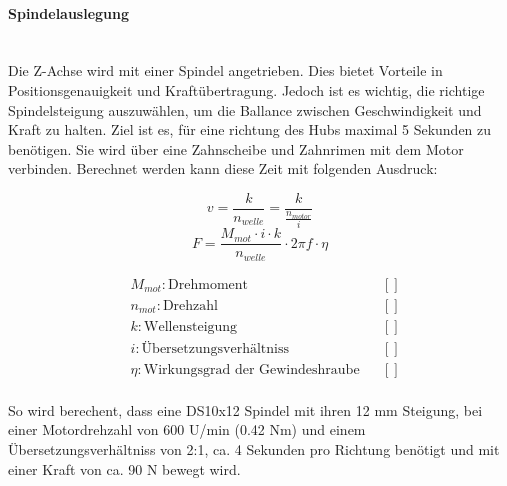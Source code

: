 \paragraph{Spindelauslegung}\mbox{}\\
Die Z-Achse wird mit einer Spindel angetrieben. Dies bietet Vorteile in Positionsgenauigkeit und Kraftübertragung. Jedoch ist es wichtig, die richtige Spindelsteigung auszuwählen, um die Ballance zwischen Geschwindigkeit und Kraft zu halten. Ziel ist es, für eine richtung des Hubs maximal 5 Sekunden zu benötigen. Sie wird über eine Zahnscheibe und Zahnrimen mit dem Motor verbinden.
Berechnet werden kann diese Zeit mit folgenden Ausdruck:

\vspace{5mm}
\noindent\begin{minipage}{\textwidth}
\begin{minipage}[t]{0.5\textwidth}
    \begin{equation*}
        v = \frac{k}{n_{welle}} = \frac{k}{\frac{n_{motor}}{i}}
    \end{equation*}
    \begin{equation*}
        F = \frac{M_{mot} \cdot i \cdot k}{n_{welle}} \cdot 2 \pi f \cdot \eta 
    \end{equation*}
\end{minipage}%
\begin{minipage}[t]{0.5\textwidth}
    \vspace{-7mm}
    \begin{align*}
        &M_{mot}: \text{Drehmoment} & &\left[\right]\\
        &n_{mot}: \text{Drehzahl} & &\left[\right]\\
        &k: \text{Wellensteigung} & &\left[\right]\\
        &i: \text{Übersetzungsverhältniss} & &\left[\right]\\
        &\eta: \text{Wirkungsgrad der Gewindeshraube} & &\left[\right]\\
    \end{align*}
\end{minipage}
\end{minipage}

\vspace{5mm}

So wird berechent, dass eine DS10x12 Spindel mit ihren 12 mm Steigung, bei einer Motordrehzahl von 600 U/min (0.42 Nm) und einem Übersetzungsverhältniss von 2:1, ca. 4 Sekunden pro Richtung benötigt und mit einer Kraft von ca. 90 N bewegt wird. 

